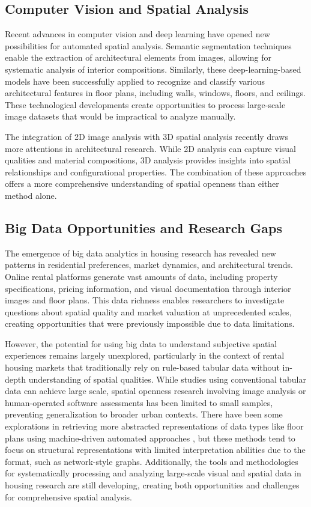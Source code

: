 \subsection{Computer Vision and Spatial Analysis}

Recent advances in computer vision and deep learning have opened new possibilities for automated spatial analysis. 
Semantic segmentation techniques enable the extraction of architectural elements from images, allowing for systematic 
analysis of interior compositions. Similarly, these deep-learning-based models have been successfully applied to recognize and 
classify various architectural features in floor plans, including walls, windows, floors, and ceilings. These technological 
developments create opportunities to process large-scale image datasets that would be impractical to analyze manually.

The integration of 2D image analysis with 3D spatial analysis recently draws more attentions in architectural research. While 
2D analysis can capture visual qualities and material compositions, 3D analysis provides insights into spatial 
relationships and configurational properties. The combination of these approaches offers a more comprehensive 
understanding of spatial openness than either method alone.

\subsection{Big Data Opportunities and Research Gaps}

The emergence of big data analytics in housing research has revealed new patterns in residential preferences, market 
dynamics, and architectural trends. Online rental platforms generate vast amounts of data, including property 
specifications, pricing information, and visual documentation through interior images and floor plans. This data 
richness enables researchers to investigate questions about spatial quality and market valuation at unprecedented 
scales, creating opportunities that were previously impossible due to data limitations.

However, the potential for using big data to understand subjective spatial experiences remains largely unexplored, 
particularly in the context of rental housing markets that traditionally rely on rule-based tabular data without 
in-depth understanding of spatial qualities. While studies using conventional tabular data can achieve large scale, 
spatial openness research involving image analysis or human-operated software assessments has been limited to small 
samples, preventing generalization to broader urban contexts. There have been some explorations in retrieving more 
abstracted representations of data types like floor plans using machine-driven automated approaches \cite{yamada2021graph}, 
but these methods tend to focus on structural representations with limited interpretation abilities due to the format, such as network-style graphs. Additionally, the tools and methodologies for 
systematically processing and analyzing large-scale visual and spatial data in housing research are still developing, creating both opportunities and challenges for comprehensive spatial analysis.

